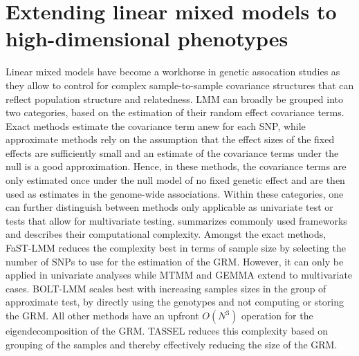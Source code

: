 \chapter{Extending linear mixed models to high-dimensional phenotypes}
\label{chapter:limmbo}
Linear mixed models have become a workhorse in genetic assocation studies as they allow to control for complex sample-to-sample covariance structures that can reflect population structure and relatedness. LMM can broadly be grouped into two categories, based on the estimation of their random effect covariance terms. Exact methods estimate the covariance term anew for each SNP, while approximate methods rely on the assumption that the effect sizes of the fixed effects are sufficiently small \citep{Kang2010,Zhang2010} and an estimate of the covariance terms under the null is a good approximation. Hence, in these methods, the covariance terms are only estimated once under the null model of no fixed genetic effect and are then used as estimates in the genome-wide associations. Within these categories, one can further distinguish between methods only applicable as univariate test or tests that allow for multivariate testing.  summarizes commonly used frameworks and describes their computational complexity.  Amongst the exact methods, FaST-LMM reduces the complexity best in terms of sample size by selecting the number of SNPs to use for the estimation of the GRM.  However, it can only be applied in univariate analyses while MTMM and GEMMA extend to multivariate cases.  BOLT-LMM scales best with increasing samples sizes in the group of approximate test, by directly using the genotypes and not computing or storing the GRM. All other methods have an upfront \(O(N^3)\) operation for the eigendecomposition of the GRM. TASSEL reduces this complexity based on grouping of the samples and thereby effectively reducing the size of the GRM.

